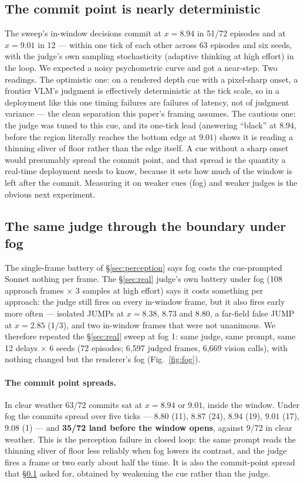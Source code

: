 \documentclass[11pt]{article}
\begin{document}
\subsection{The commit point is nearly deterministic}\label{sec:commit}

The sweep's in-window decisions commit at $x = 8.94$ in 51/72 episodes and at
$x = 9.01$ in 12 --- within one tick of each other across 63 episodes and six
seeds, with the judge's own sampling stochasticity (adaptive thinking at high
effort) in the loop. We expected a noisy psychometric curve and got a
near-step. Two readings. The optimistic one: on a rendered depth cue with a
pixel-sharp onset, a frontier VLM's judgment is effectively deterministic at
the tick scale, so in a deployment like this one timing failures are failures
of latency, not of judgment variance --- the clean separation this paper's
framing assumes. The cautious one: the judge was tuned to this cue, and its
one-tick lead (answering ``black'' at $8.94$, before the region literally
reaches the bottom edge at $9.01$) shows it is reading a thinning sliver of
floor rather than the edge itself. A cue without a sharp onset would presumably
spread the commit point, and that spread is the quantity a real-time deployment
needs to know, because it sets how much of the window is left after the commit.
Measuring it on weaker cues (fog) and weaker judges is the obvious next
experiment.

\subsection{The same judge through the boundary under fog}\label{sec:fog}

The single-frame battery of \S\ref{sec:perception} says fog costs the
cue-prompted Sonnet nothing per frame. The \S\ref{sec:real} judge's own
battery under fog (108 approach frames $\times$ 3 samples at high effort)
says it costs something per approach: the
judge still fires on every in-window frame, but it also fires early more
often --- isolated JUMPs at $x = 8.38$, $8.73$ and $8.80$, a far-field false
JUMP at $x = 2.85$ (1/3), and two in-window frames that were not unanimous.
We therefore repeated the \S\ref{sec:real} sweep at fog 1: same judge, same
prompt, same 12 delays $\times$ 6 seeds (72 episodes; 6{,}597 judged frames,
6{,}669 vision calls),
with nothing changed but the renderer's fog (Fig.~\ref{fig:fog}).

\paragraph{The commit point spreads.} In clear weather 63/72 commits sat at
$x = 8.94$ or $9.01$, inside the window. Under fog the commits spread over
five ticks --- $8.80$ (11), $8.87$ (24), $8.94$ (19), $9.01$ (17), $9.08$ (1)
--- and \textbf{35/72 land before the window opens}, against 9/72 in clear
weather. This is the perception failure in closed loop: the same prompt reads
the thinning sliver of floor less reliably when fog lowers its contrast, and
the judge fires a frame or two early about half the time. It is also the
commit-point spread that \S\ref{sec:commit} asked for, obtained by weakening
the cue rather than the judge.
\end{document}
